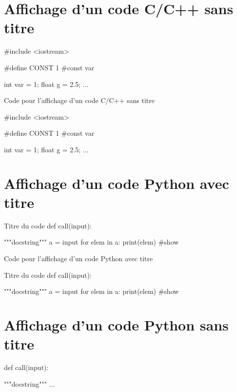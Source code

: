 \documentclass[12pt]{report}
\begin{document}
\section{Affichage d'un code C/C++ sans titre}


\begin{Cpp}
#include <iostream>

#define CONST 1 #const var

int var = 1;
float g = 2.5;
...

\end{Cpp}

\begin{Latex}{Code pour l'affichage d'un code C/C++ sans titre}
    \begin{Cpp}
        #include <iostream>
        
        #define CONST 1 #const var
        
        int var = 1;
        float g = 2.5;
        ...
        
        \end{Cpp}
\end{Latex}


\section{Affichage d'un code Python avec titre}


\begin{Python}{Titre du code}
def call(input):

  """docstring"""
  a = input
  for elem in a:
    print(elem) #show
\end{Python}

\begin{Latex}{Code pour l'affichage d'un code Python avec titre}
  \begin{Python}{Titre du code}
    def call(input):
    
      """docstring"""
      a = input
      for elem in a:
        print(elem) #show
    \end{Python}
\end{Latex}

\section{Affichage d'un code Python sans titre}


\begin{Python}
def call(input):

  """docstring"""
  ...
\end{Python}
\end{document}
